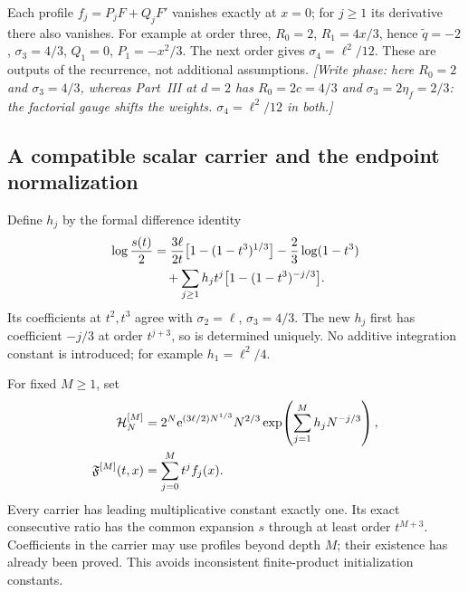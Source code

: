 \documentclass[11pt,letterpaper]{article}
\newcommand{\ee}{\mathrm e}
\theoremstyle{remark}
\begin{document}
Each profile $f_j=P_jF+Q_jF'$ vanishes exactly at $x=0$; for $j\ge1$ its derivative there also vanishes. For example at order three,
$R_0=2$, $R_1=4x/3$, hence $\widetilde q=-2$, $\sigma_3=4/3$, $Q_1=0$, $P_1=-x^2/3$. The next order gives $\sigma_4=\ell^2/12$. These are outputs of the recurrence, not additional assumptions. \emph{[Write phase: here $R_0=2$ and $\sigma_3=4/3$, whereas Part~III at $d=2$ has $R_0=2c=4/3$ and $\sigma_3=2\eta_f=2/3$: the factorial gauge shifts the weights. $\sigma_4=\ell^2/12$ in both.]}

\subsection{A compatible scalar carrier and the endpoint normalization}
Define $h_j$ by the formal difference identity
\begin{align}
 \log\frac{s(t)}2
 &=\frac{3\ell}{2t}\bigl[1-(1-t^3)^{1/3}\bigr]-\frac23\log(1-t^3)\notag\\
 &\quad+\sum_{j\ge1}h_jt^j\bigl[1-(1-t^3)^{-j/3}\bigr].\label{tcn:w:carrier}
\end{align}
Its coefficients at $t^2,t^3$ agree with $\sigma_2=\ell$, $\sigma_3=4/3$. The new $h_j$ first has coefficient $-j/3$ at order $t^{j+3}$, so is determined uniquely. No additive integration constant is introduced; for example $h_1=\ell^2/4$.

For fixed $M\ge1$, set
\begin{align}
 \mathcal H_N^{[M]}&=2^N\ee^{(3\ell/2)N^{1/3}}N^{2/3}
                  \exp\!\left(\sum_{j=1}^Mh_jN^{-j/3}\right),\label{tcn:w:H}\\
 \mathfrak F^{[M]}(t,x)&=\sum_{j=0}^Mt^jf_j(x).\notag
\end{align}
Every carrier has leading multiplicative constant exactly one. Its exact consecutive ratio has the common expansion $s$ through at least order $t^{M+3}$. Coefficients in the carrier may use profiles beyond depth $M$; their existence has already been proved. This avoids inconsistent finite-product initialization constants.
\end{document}
